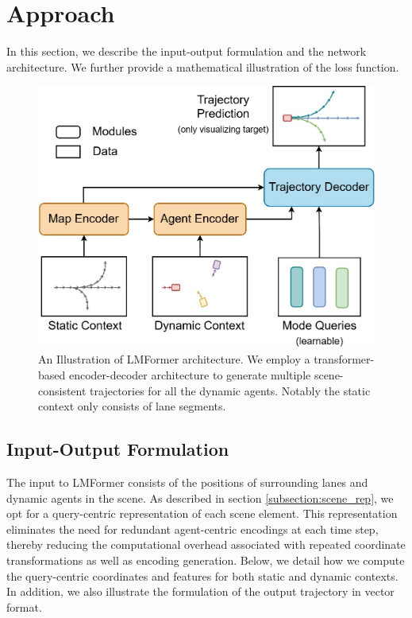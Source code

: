 \section{Approach}\label{section:approach}
In this section, we describe the input-output formulation and the network architecture. We further provide a mathematical illustration of the loss function. 
\begin{figure}
    \centering
    \includegraphics[width=0.9\linewidth]{images/lane_based_prediction_overall_architecture.jpg}
    \caption{An Illustration of LMFormer architecture. We employ a transformer-based encoder-decoder architecture to generate multiple scene-consistent trajectories for all the dynamic agents. Notably the static context only consists of lane segments.}
    \label{fig:overall_net}
\end{figure}

\subsection{Input-Output Formulation}\label{subsection:IO_formulation}
The input to LMFormer consists of the positions of surrounding lanes and dynamic agents in the scene. As described in section \ref{subsection:scene_rep}, we opt for a query-centric representation \cite{zhou2023query} of each scene element. This representation eliminates the need for redundant agent-centric encodings at each time step, thereby reducing the computational overhead associated with repeated coordinate transformations as well as encoding generation. Below, we detail how we compute the query-centric coordinates and features for both static and dynamic contexts. In addition, we also illustrate the formulation of the output trajectory in vector format.

